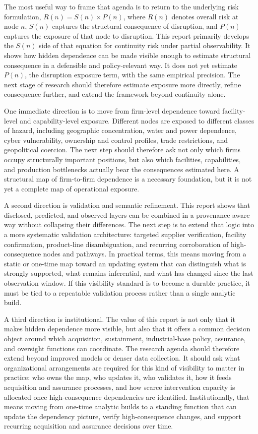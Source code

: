 The most useful way to frame that agenda is to return to the underlying risk formulation, \(R(n)=S(n)\times P(n)\), where \(R(n)\) denotes overall risk at node \(n\), \(S(n)\) captures the structural consequence of disruption, and \(P(n)\) captures the exposure of that node to disruption. This report primarily develops the \(S(n)\) side of that equation for continuity risk under partial observability. It shows how hidden dependence can be made visible enough to estimate structural consequence in a defensible and policy-relevant way. It does not yet estimate \(P(n)\), the disruption exposure term, with the same empirical precision. The next stage of research should therefore estimate exposure more directly, refine consequence further, and extend the framework beyond continuity alone.

One immediate direction is to move from firm-level dependence toward facility-level and capability-level exposure. Different nodes are exposed to different classes of hazard, including geographic concentration, water and power dependence, cyber vulnerability, ownership and control profiles, trade restrictions, and geopolitical coercion. The next step should therefore ask not only which firms occupy structurally important positions, but also which facilities, capabilities, and production bottlenecks actually bear the consequences estimated here. A structural map of firm-to-firm dependence is a necessary foundation, but it is not yet a complete map of operational exposure.

A second direction is validation and semantic refinement. This report shows that disclosed, predicted, and observed layers can be combined in a provenance-aware way without collapsing their differences. The next step is to extend that logic into a more systematic validation architecture: targeted supplier verification, facility confirmation, product-line disambiguation, and recurring corroboration of high-consequence nodes and pathways. In practical terms, this means moving from a static or one-time map toward an updating system that can distinguish what is strongly supported, what remains inferential, and what has changed since the last observation window. If this visibility standard is to become a durable practice, it must be tied to a repeatable validation process rather than a single analytic build.

A third direction is institutional. The value of this report is not only that it makes hidden dependence more visible, but also that it offers a common decision object around which acquisition, sustainment, industrial-base policy, assurance, and oversight functions can coordinate. The research agenda should therefore extend beyond improved models or denser data collection. It should ask what organizational arrangements are required for this kind of visibility to matter in practice: who owns the map, who updates it, who validates it, how it feeds acquisition and assurance processes, and how scarce intervention capacity is allocated once high-consequence dependencies are identified. Institutionally, that means moving from one-time analytic builds to a standing function that can update the dependency picture, verify high-consequence changes, and support recurring acquisition and assurance decisions over time.

